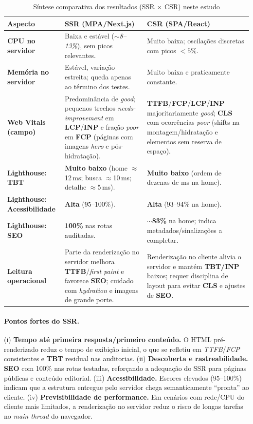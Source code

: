 \begin{table}[H]
\centering
\caption{Síntese comparativa dos resultados (SSR $\times$ CSR) neste estudo}
\label{tab:comparativo-ssr-csr}
\begin{tabular}{|p{4.2cm}|p{5.2cm}|p{5.2cm}|}
\hline
\textbf{Aspecto} & \textbf{SSR (MPA/Next.js)} & \textbf{CSR (SPA/React)} \\
\hline
\textbf{CPU no servidor} & Baixa e estável (\textit{$\sim$8--13\%}), sem picos relevantes. & Muito baixa; oscilações discretas com picos $<5\%$. \\
\hline
\textbf{Memória no servidor} & Estável, variação estreita; queda apenas ao término dos testes. & Muito baixa e praticamente constante. \\
\hline
\textbf{Web Vitals (campo)} & Predominância de \textit{good}; pequenos trechos \textit{needs-improvement} em \textbf{LCP}/\textbf{INP} e fração \textit{poor} em \textbf{FCP} (páginas com imagens \emph{hero} e pós-hidratação). & \textbf{TTFB}/\textbf{FCP}/\textbf{LCP}/\textbf{INP} majoritariamente \textit{good}; \textbf{CLS} com ocorrências \textit{poor} (shifts na montagem/hidratação e elementos sem reserva de espaço). \\
\hline
\textbf{Lighthouse: TBT} & \textbf{Muito baixo} (home $\approx$12\,ms; busca $\approx$10\,ms; detalhe $\approx$5\,ms). & \textbf{Muito baixo} (ordem de dezenas de ms na home). \\
\hline
\textbf{Lighthouse: Acessibilidade} & \textbf{Alta} (95--100\%). & \textbf{Alta} (93--94\% na home). \\
\hline
\textbf{Lighthouse: SEO} & \textbf{100\%} nas rotas auditadas. & \textbf{$\sim$83\%} na home; indica metadados/sinalizações a completar. \\
\hline
\textbf{Leitura operacional} & Parte da renderização no servidor melhora \textbf{TTFB}/\emph{first paint} e favorece \textbf{SEO}; cuidado com \emph{hydration} e imagens de grande porte. & Renderização no cliente alivia o servidor e mantém \textbf{TBT/INP} baixos; requer disciplina de layout para evitar \textbf{CLS} e ajustes de \textbf{SEO}. \\
\hline
\end{tabular}
\end{table}

\paragraph{Pontos fortes do SSR.}
(i) \textbf{Tempo até primeira resposta/primeiro conteúdo.} O HTML pré-renderizado reduz o tempo de exibição inicial, o que se refletiu em \textit{TTFB}/\textit{FCP} consistentes e \textbf{TBT} residual nas auditorias.  
(ii) \textbf{Descoberta e rastreabilidade.} \textbf{SEO} com 100\% nas rotas testadas, reforçando a adequação do SSR para páginas públicas e conteúdo editorial.  
(iii) \textbf{Acessibilidade.} Escores elevados (95--100\%) indicam que a estrutura entregue pelo servidor chega semanticamente “pronta” ao cliente.  
(iv) \textbf{Previsibilidade de performance.} Em cenários com rede/CPU do cliente mais limitados, a renderização no servidor reduz o risco de longas tarefas no \emph{main thread} do navegador.


